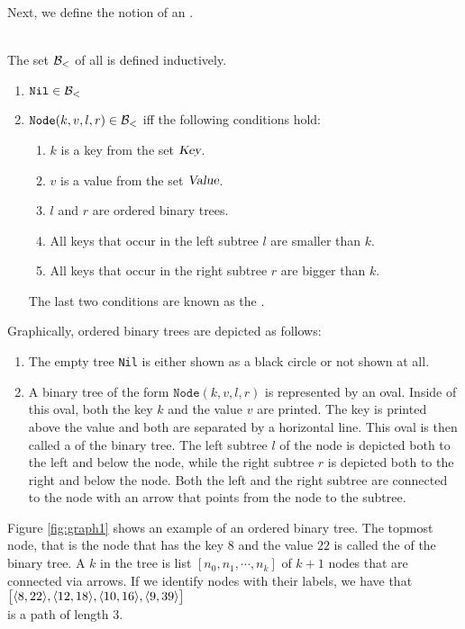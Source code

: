 \noindent
Next, we define the notion of an  .
\begin{Definition} \hspace*{\fill} \\
  The set $\mathcal{B}_<$ of all  is defined inductively.
  \begin{enumerate}
  \item $\texttt{Nil} \in \mathcal{B}_<$
  \item $\texttt{Node}(k, v, l, r) \in \mathcal{B}_<$ \quad iff the following conditions hold:
        \begin{enumerate}
        \item $k$ is a key from the set $\textsl{Key}$.
        \item $v$ is a value from the set $\textsl{Value}$.
        \item $l$ and $r$ are ordered binary trees.
        \item All keys that occur in the left subtree $l$ are smaller than $k$.
        \item All keys that occur in the right subtree $r$ are bigger than $k$.
        \end{enumerate}
        The last two conditions are known as the .
        \eox
  \end{enumerate}
\end{Definition}
Graphically, ordered binary trees are depicted as follows:
\begin{enumerate}
\item The empty tree \texttt{Nil} is either shown as a black circle or not shown at all.
\item A binary tree of the form $\texttt{Node}(k,v,l,r)$ is represented by an oval.  Inside of this
      oval, both the key $k$ and the value $v$ are printed.  The key is printed above the value and
      both are separated by a horizontal line.  This oval is then called a
       of the binary tree. 
      The left subtree $l$ of the node is depicted both to the left and  below the node,
      while the right subtree $r$ is depicted both to the right and below the node.  Both the left
      and the right subtree are connected to the node with an arrow that points from the node to the
      subtree.
\end{enumerate}
Figure \ref{fig:graph1} shows an example of an ordered binary tree.  The topmost node, that is the
node that has the key $8$ and the value $22$ is called the  of the binary tree.
A  $k$ in the tree is  list $[n_0,n_1, \cdots, n_k]$ of
$k+1$ nodes that are connected via arrows.  If we identify nodes with their labels, we have that
\\[0.2cm]
\hspace*{1.3cm} $\bigl[ \pair(8,22), \pair(12,18), \pair(10,16), \pair(9,39) \bigr]$ \\[0.2cm]
is a path of length 3.


